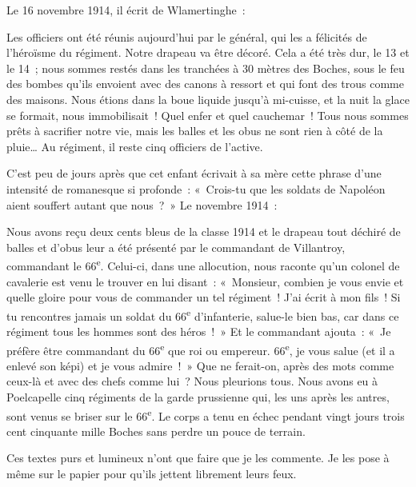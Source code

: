 \documentclass[french,twoside]{book} %
\newenvironment{quoteblock}%
  {\begin{quoting}}
  {\end{quoting}}
\newenvironment{quotebar}{%
    \def\FrameCommand{{\color{rubric!10!}\vrule width 0.5em} \hspace{0.9em}}%
    \def\OuterFrameSep{\itemsep} %
    \MakeFramed {\advance\hsize-\width \FrameRestore}
  }%
  {%
    \endMakeFramed
  }
\renewenvironment{quoteblock}%
  {%
    \savenotes
    \setstretch{0.9}
    \normalfont
    \begin{quotebar}
  }
  {%
    \end{quotebar}
    \spewnotes
  }
\begin{document}
\noindent Le 16 novembre 1914, il écrit de Wlamertinghe :‌\par

\begin{quoteblock}
 \noindent Les officiers ont été réunis aujourd’hui par le général, qui les a félicités de l’héroïsme du régiment. Notre drapeau va être décoré. Cela a été très dur, le 13 et le 14 ; nous sommes restés dans les tranchées à 30 mètres des Boches, sous le feu des bombes qu’ils envoient avec des canons à ressort et qui font des trous comme des maisons. Nous étions dans la boue liquide jusqu’à mi-cuisse, et la nuit la glace se formait, nous immobilisait ! Quel enfer et quel cauchemar ! Tous nous sommes prêts à sacrifier notre vie, mais les balles et les obus ne sont rien à côté de la pluie… Au régiment, il reste cinq officiers de l’active.‌
 \end{quoteblock}

\noindent C’est peu de jours après que cet enfant écrivait à sa mère cette phrase d’une intensité de romanesque si profonde : « Crois-tu que les soldats de Napoléon aient souffert autant que nous ? » Le novembre 1914 :‌\par

\begin{quoteblock}
 \noindent Nous avons reçu deux cents bleus de la classe 1914 et le drapeau tout déchiré de balles et d’obus leur a été présenté par le commandant de Villantroy, commandant le 66\textsuperscript{e}. Celui-ci, dans une allocution, nous raconte qu’un colonel de cavalerie est venu le trouver en lui disant : « Monsieur, combien je vous envie et quelle gloire pour vous de commander un tel régiment ! J’ai écrit à mon fils ! Si tu rencontres jamais un soldat du 66\textsuperscript{e} d’infanterie, salue-le bien bas, car dans ce régiment tous les hommes sont des héros ! » Et le commandant ajouta : « Je préfère être commandant du 66\textsuperscript{e} que roi ou empereur. 66\textsuperscript{e}, je vous salue (et il a enlevé son képi) et je vous admire ! » Que ne ferait-on, après des mots comme ceux-là et avec des chefs comme lui ? Nous pleurions tous. Nous avons eu à Poelcapelle cinq régiments de la garde prussienne qui, les uns après les antres, sont venus se briser sur le 66\textsuperscript{e}. Le corps a tenu en échec pendant vingt jours trois cent cinquante mille Boches sans perdre un pouce de terrain.‌
 \end{quoteblock}

\noindent Ces textes purs et lumineux n’ont que faire que je les commente. Je les pose à même sur le papier pour qu’ils jettent librement leurs feux.‌\par
\end{document}
